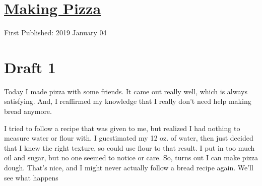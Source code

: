 \documentclass[12pt]{article}[titlepage]
\newcommand{\1}{\={a}}
\newcommand{\2}{\={e}}
\newcommand{\3}{\={\i}}
\newcommand{\4}{\=o}
\newcommand{\5}{\=u}
\newcommand{\6}{\={A}}
\renewcommand{\,}{\textsuperscript{,}}
\begin{document}
\doublespacing
\section{\href{making-pizza.html}{Making Pizza}}
First Published: 2019 January 04
\section{Draft 1}
Today I made pizza with some friends.
It came out really well, which is always satisfying.
And, I reaffirmed my knowledge that I really don't need help making bread anymore.

I tried to follow a recipe that was given to me, but realized I had nothing to measure water or flour with.
I guestimated my 12 oz. of water, then just decided that I knew the right texture, so could use flour to that result.
I put in too much oil and sugar, but no one seemed to notice or care.
So, turns out I can make pizza dough.
That's nice, and I might never actually follow a bread recipe again.
We'll see what happens
\end{document}
